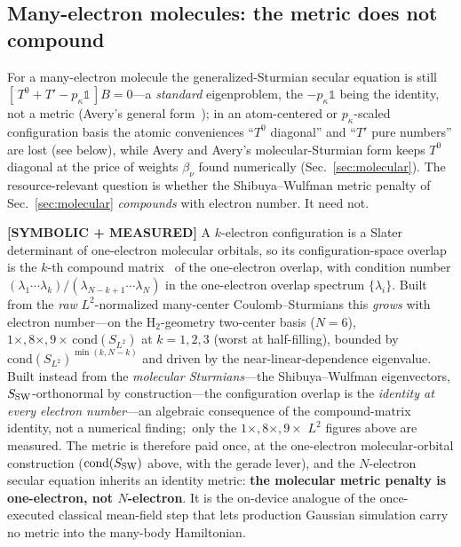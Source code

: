 \documentclass[aps,pra,twocolumn,superscriptaddress,longbibliography]{revtex4-2}
\begin{document}
\subsection{Many-electron molecules: the metric does not compound}
\label{sec:manyelectron}

For a many-electron molecule the generalized-Sturmian secular equation is still
$[\,T^0+T'-p_\kappa\mathbb{1}\,]B=0$---a \emph{standard} eigenproblem, the $-p_\kappa\mathbb{1}$ being
the identity, not a metric (Avery's general form~\cite{averyphd}); in an atom-centered or $p_\kappa$-scaled configuration
basis the atomic conveniences ``$T^0$ diagonal'' and ``$T'$ pure numbers'' are lost (see below), while
Avery and Avery's molecular-Sturmian form keeps $T^0$ diagonal at the price of weights $\beta_\nu$
found numerically (Sec.~\ref{sec:molecular}).  The resource-relevant question is whether the
Shibuya--Wulfman metric penalty of Sec.~\ref{sec:molecular} \emph{compounds} with electron number.
It need not.

\textbf{[SYMBOLIC + MEASURED]} A $k$-electron configuration is a Slater determinant of one-electron molecular
orbitals, so its configuration-space overlap is the $k$-th compound matrix~\cite{lowdin1955,prosser_hagstrom1968,king1967,burton2021} of the one-electron
overlap, with condition number $(\lambda_1\cdots\lambda_k)/(\lambda_{N-k+1}\cdots\lambda_N)$ in the
one-electron overlap spectrum $\{\lambda_i\}$.  Built from the \emph{raw} $L^2$-normalized
many-center Coulomb--Sturmians this \emph{grows} with electron number---on the H$_2$-geometry
two-center basis ($N=6$), $1\times,8\times,9\times\,\mathrm{cond}(S_{L^2})$ at $k=1,2,3$ (worst at
half-filling), bounded by $\mathrm{cond}(S_{L^2})^{\min(k,N-k)}$ and driven by the
near-linear-dependence eigenvalue.  Built instead from the \emph{molecular Sturmians}---the
Shibuya--Wulfman eigenvectors, $S_{\rm SW}$-orthonormal by construction---the configuration overlap
is the \emph{identity at every electron number}---an algebraic consequence of the
compound-matrix identity, not a numerical finding;\ only the $1\times,8\times,9\times$
$L^2$ figures above are measured.  The metric is therefore paid once, at the
one-electron molecular-orbital construction ($\mathrm{cond}(S_{\rm SW})$ above, with the gerade
lever), and the $N$-electron secular equation inherits an identity metric:
\textbf{the molecular metric penalty is one-electron, not $N$-electron}.  It is the on-device analogue
of the once-executed classical mean-field step that lets production Gaussian simulation carry no
metric into the many-body Hamiltonian.
\end{document}
